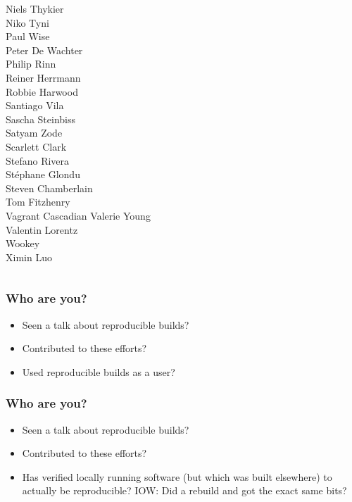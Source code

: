 \documentclass[14pt,aspectratio=169]{beamer}
\newif\ifplacelogo
\begin{document}
\begin{frame}
\begin{center}
\begin{columns}
    {Niels Thykier} \\
    Niko Tyni \\
    {Paul Wise} \\
    Peter De Wachter \\
    Philip Rinn \\
    {Reiner Herrmann} \\
    Robbie Harwood \\
    {Santiago Vila} \\
    {Sascha Steinbiss} \\
    {Satyam Zode} \\
    {Scarlett Clark} \\
    {Stefano Rivera} \\
    {Stéphane Glondu} \\
    {Steven Chamberlain} \\
    Tom Fitzhenry \\
    Vagrant Cascadian
    {Valerie Young} \\
    Valentin Lorentz \\
    {Wookey} \\
    {Ximin Luo} \\
  \end{columns}
 \end{center}
\end{frame}


\placelogofalse

\begin{frame}
 \frametitle{Who are you?}
 \begin{itemize}
  \item<2-4> Seen a talk about reproducible builds?
  \item<3-4> Contributed to these efforts?
  \item<4> Used reproducible builds as a user?
 \end{itemize}
\end{frame}

\begin{frame}
 \frametitle{Who are you?}
 \begin{itemize}
  \item Seen a talk about reproducible builds?
  \item Contributed to these efforts?
  \item Has verified locally running software (but which was built elsewhere) to actually be reproducible? IOW: Did a rebuild and got the exact same bits?
 \end{itemize}
\end{frame}
\end{document}
